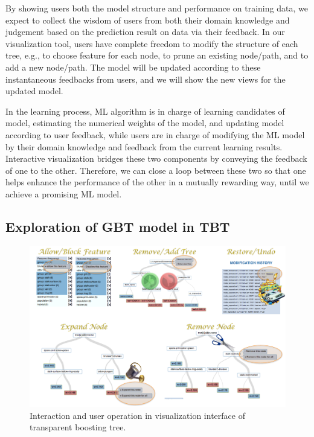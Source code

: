 \documentclass{chi2009}
\begin{document}
By showing users both the model structure and performance on training data, we expect to collect the wisdom of users from both their domain knowledge and judgement based on the prediction result on data via their feedback. In our visualization tool, users have complete freedom to modify the structure of each tree, e.g., to choose feature for each node, to prune an existing node/path, and to add a new node/path. The model will be updated according to these instantaneous feedbacks from users, and we will show the new views for the updated model. 

In the learning process, ML algorithm is in charge of learning candidates of model, estimating the numerical weights of the model, and updating model according to user feedback, while users are in charge of modifying the ML model by their domain knowledge and feedback from the current learning results. Interactive visualization bridges these two components by conveying the feedback of one to the other. Therefore,  we can close a loop between these two so that one helps enhance the performance of the other in a mutually rewarding way, until we achieve a promising ML model.

\subsection{Exploration of GBT model in TBT}

\begin{figure}[tH!]
\begin{center}
 \includegraphics[width=1\linewidth]{user.pdf}
\end{center}
   \caption{Interaction and user operation in visualization interface of transparent boosting tree.}
\label{fig:user}
\end{figure} 
\end{document}
